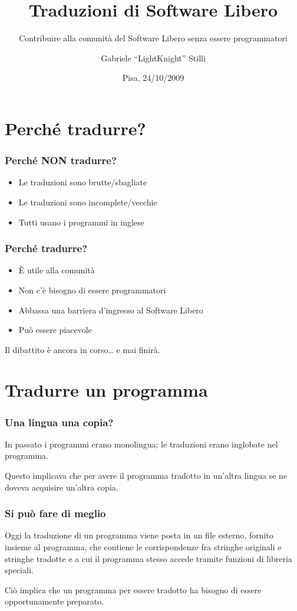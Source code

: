 \documentclass{beamer}
\title{Traduzioni di Software Libero}
\subtitle{Contribuire alla comunità del Software Libero senza essere
programmatori}
\author{Gabriele ``LightKnight'' Stilli}
\institute{G.U.L.P. -- Gruppo Utenti Linux Pisa}
\date{Pisa, 24/10/2009}
\begin{document}
\frame{\titlepage}

\frame{\tableofcontents}

\section{Perché tradurre?}

\begin{frame}\frametitle{Perché NON tradurre?}
\begin{itemize}
\item Le traduzioni sono brutte/sbagliate
\item Le traduzioni sono incomplete/vecchie
\item Tutti usano i programmi in inglese
\end{itemize}
\end{frame}

\begin{frame}\frametitle{Perché tradurre?}
\begin{itemize}
\item È utile alla comunità
\item Non c'è bisogno di essere programmatori
\item Abbassa una barriera d'ingresso al Software Libero
\item Può essere piacevole
\end{itemize}
\pause
Il dibattito è ancora in corso{\ldots} e mai finirà.
\end{frame}

\section{Tradurre un programma}

\begin{frame}\frametitle{Una lingua una copia?}
In passato i programmi erano monolingua; le traduzioni erano inglobate
nel programma.

Questo implicava che per avere il programma tradotto in un'altra
lingua se ne doveva acquisire un'altra copia.
\end{frame}

\begin{frame}\frametitle{Si può fare di meglio}
Oggi la traduzione di un programma viene posta in un file esterno,
fornito insieme al programma, che contiene le corrispondenze fra
stringhe originali e stringhe tradotte e a cui il programma stesso
accede tramite funzioni di libreria speciali.

Ciò implica che un programma per essere tradotto ha bisogno di essere
opportunamente preparato.
\end{frame}
\end{document}
